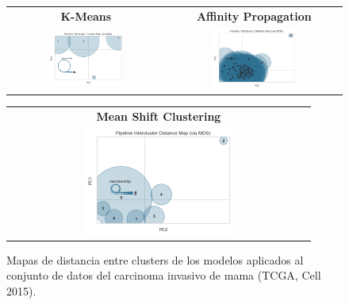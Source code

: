 \begin{figure} 
	\setlength\tabcolsep{3pt}%
	\centering
	\caption{Mapas de distancia entre clusters de los modelos aplicados al conjunto de datos del carcinoma invasivo de mama (TCGA, Cell 2015).}
	\label{distance}
	\begin{tabular}{|c|c|}
		\hline
		\textbf{K-Means} &
		\textbf{Affinity Propagation} \\
		\includegraphics[width=0.5\textwidth]{NOTEBOOK/IMAGENES_CLUSTERING/1_MAP_Kmeans} &
		\includegraphics[width=0.5\textwidth]{NOTEBOOK/IMAGENES_CLUSTERING/2_MAP_Affinity_Propagation} 
		\\ \hline
	\end{tabular}
	\begin{tabular}{|c|}
		\hline
		\textbf{Mean Shift Clustering} \\
		\includegraphics[width=0.5\textwidth]{NOTEBOOK/IMAGENES_CLUSTERING/3_MAP_Meanshift_Distance}
		\\ \hline
	\end{tabular}
\end{figure}


